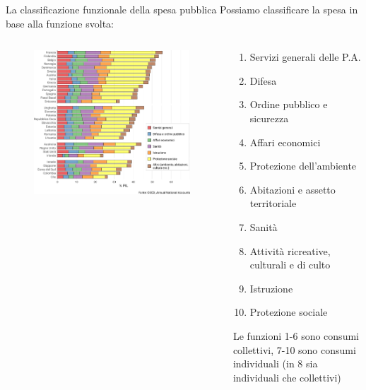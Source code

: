 \documentclass[aspectratio=64,11pt]{beamer}
\begin{document}
\begin{frame}{La classificazione funzionale della spesa pubblica}
Possiamo classificare la spesa in base alla funzione svolta:

\begin{columns}
\begin{column}{.6\columnwidth}
\begin{figure}
\centering
\includegraphics[width=\textwidth]{./figure/spesa-pubblica-per-funzioni-2019-orizz-color.pdf}
\end{figure}
\end{column}

\begin{column}{.4\columnwidth}
\footnotesize
\begin{enumerate}
\item Servizi generali delle P.A.
\item Difesa
\item Ordine pubblico e sicurezza
\item Affari economici
\item Protezione dell’ambiente
\item Abitazioni e assetto territoriale
\item Sanità
\item Attività ricreative, culturali e di culto
\item Istruzione
\item Protezione sociale
\end{enumerate}
Le funzioni 1-6 sono consumi collettivi, 7-10 sono consumi individuali (in 8 sia individuali che collettivi)
\end{column}
\end{columns}
\end{frame}
\end{document}
